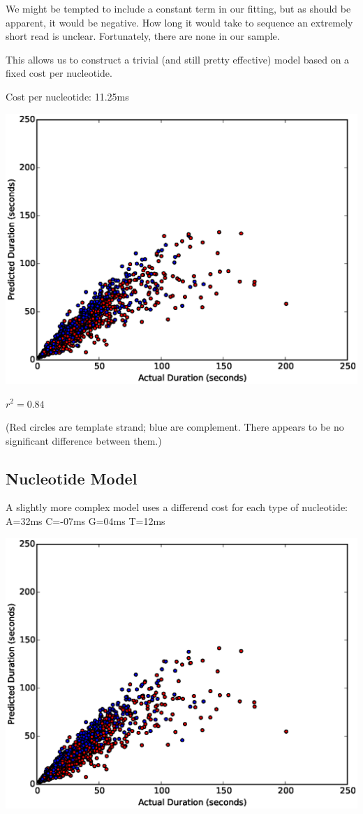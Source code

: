 \documentclass[11pt]{article}
\begin{document}
        We might be tempted to include a constant term in our fitting, but as should be apparent, it would be
        negative.  How long it would take to sequence an extremely short read is unclear.  Fortunately, there 
        are none in our sample.

        \newpage
        This allows us to construct a trivial (and still pretty effective) model based on a fixed cost per nucleotide.

        Cost per nucleotide: 11.25ms
        
\includegraphics[width=\textwidth]{part11scatter0mer}

$r^2=0.84$


(Red circles are template strand; blue are complement.  There appears to be no significant difference between them.)

\newpage
\subsection*{Nucleotide Model}
A slightly more complex model uses a differend cost for each type of nucleotide: 
A=32ms 
C=-07ms 
G=04ms 
T=12ms 


\includegraphics[width=\textwidth]{part11scatter1mer}
\end{document}
